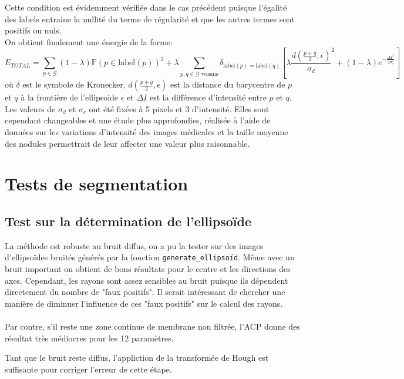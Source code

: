 \documentclass{article}
\newcommand{\lab}{\text{label}}
\begin{document}
Cette condition est évidemment vérifiée dans le cas précédent puisque l'égalité des labels entraine la nullité du terme de régularité et que les autres termes sont positifs ou nuls.\\
On obtient finalement une énergie de la forme:
\[
	E_{TOTAL} = \sum_{p \in \mathcal{G}} (1-\lambda)\mathbb{P}(p \in \lab(p))^2 + \lambda \sum _{p,q \in \mathcal{G} \text{ voisins}} \delta_{\lab(p) = \lab(q)} \left[ \lambda \frac{d\left(\frac{p+q}{2}, \epsilon \right)}{\sigma_d}^2 + (1-\lambda) e^{-\frac{\Delta I^2}{2\sigma_c^2}} \right]
\]
où $\delta$ est le symbole de Kronecker, $d\left(\frac{p+q}{2}, \epsilon \right)$ est la distance du barycentre de $p$ et $q$ à la frontière de l'ellipsoide $\epsilon$ et $\Delta I$ est la différence d'intensité entre $p$ et $q$. Les valeurs de $\sigma_d$ et $\sigma_c$ ont été fixées à 5 pixels et 3 d'intensité. Elles sont cependant changeables et une étude plus approfondies, réalisée à l'aide de données sur les variations d'intensité des images médicales et la taille moyenne des nodules permettrait de leur affecter une valeur plus raisonnable.

\section{Tests de segmentation}

\subsection{Test sur la détermination de l'ellipsoïde}


La méthode est robuste au bruit diffus, on a pu la tester sur des images d'ellipsoïdes bruités générés par la fonction \texttt{generate\_ellipsoïd}. Même avec un bruit important on obtient de bons résultats pour le centre et les directions des axes. Cependant, les rayons sont assez sensibles au bruit puisque ils dépendent directement du nombre de "faux positifs". Il serait intéressant de chercher une  manière de diminuer l'influence de ces "faux positifs" sur le calcul des rayons.\\\\ 
Par contre, s'il reste une zone continue de membrane non filtrée, l'ACP donne des résultat très médiocres pour les 12 paramètres.

Tant que le bruit reste diffus, l'appliction de la transformée de Hough est suffisante pour corriger l'erreur de cette étape.
\end{document}
